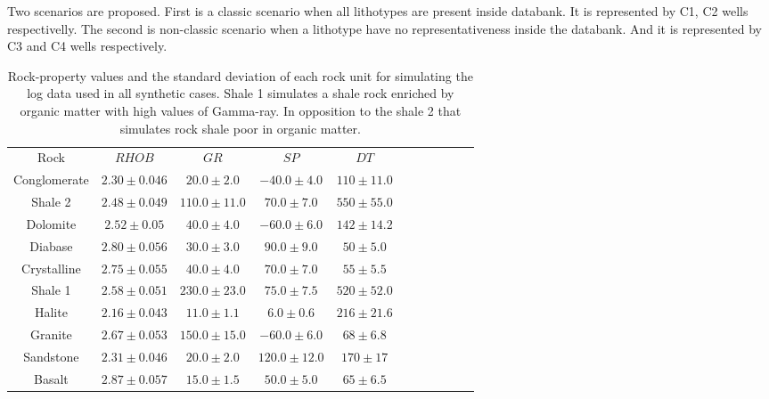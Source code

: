 \documentclass[preprint,12pt]{elsarticle}
\begin{document}
Two scenarios are proposed. First is a classic scenario when all lithotypes are present inside databank. It is represented by C1, C2 wells respectivelly. The second is non-classic scenario when a lithotype have no representativeness inside the databank. And it is represented by C3 and C4 wells respectively.  


\begin{table}[H]
	\centering
	\footnotesize
	\begin{tabular}{@{}ccccccccccc@{}}
		Rock         &   $RHOB$   &    $GR$     &     $SP$   &    $DT$    &\\ %
		Conglomerate &  $2.30 \pm 0.046  $  &  $20.0 \pm 2.0$   &  $-40.0 \pm 4.0$ &   $110 \pm 11.0$   &\\
		Shale 2	     &  $2.48 \pm 0.049$  &  $110.0 \pm 11.0 $  &  $70.0 \pm 7.0$  &   $550 \pm 55.0$   &\\
		Dolomite     &  $2.52 \pm 0.05$  &  $40.0 \pm 4.0$   &  $-60.0 \pm 6.0$ &   $142 \pm 14.2$   &\\
		Diabase      &  $2.80 \pm 0.056$  &  $30.0 \pm 3.0$   &  $90.0 \pm 9.0$  &   $50 \pm 5.0$   &\\
		Crystalline  &  $2.75 \pm 0.055$  &  $40.0 \pm 4.0$    &  $70.0 \pm 7.0$  &   $55 \pm 5.5$    &\\
		Shale 1      &  $2.58 \pm 0.051$  &  $230.0 \pm 23.0$  &  $75.0 \pm 7.5$  &   $520 \pm 52.0$   &\\
		Halite       &  $2.16 \pm 0.043$  &  $11.0 \pm 1.1$   &  $6.0 \pm 0.6$   &   $216 \pm 21.6$  &\\
		Granite      &  $2.67 \pm 0.053$  &  $150.0 \pm 15.0$  &  $-60.0 \pm 6.0$ &   $68 \pm 6.8 $   &\\
		Sandstone    &  $2.31 \pm 0.046$  &  $20.0 \pm 2.0$   &  $120.0 \pm 12.0$ &   $170 \pm 17$   &\\
		Basalt       &  $2.87 \pm 0.057$  &  $15.0 \pm 1.5$   &  $50.0 \pm 5.0$  &   $65 \pm 6.5$   &\\ %
	\end{tabular}
	\caption{Rock-property values and the standard deviation of each rock unit for simulating the log data used in all synthetic cases. Shale 1 simulates a shale rock enriched by organic matter with high values of Gamma-ray. In opposition to the shale 2 that simulates rock shale poor in organic matter. }
	\label{tab:Tab1}
\end{table}
\end{document}
